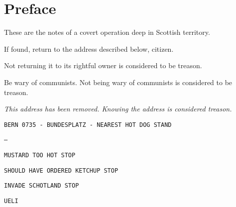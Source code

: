 \chapter{Preface}

These are the notes of a covert operation deep in Scottish territory.

\bigskip

If found, return to the address described below, citizen.

Not returning it to its rightful owner is considered to be treason.

Be wary of communists.
Not being wary of communists is considered to be treason.

\smallskip
\emph{This address has been removed. Knowing the address is considered treason.}
\smallskip

\newpage

\texttt{BERN 0735 - BUNDESPLATZ - NEAREST HOT DOG STAND}

\texttt{---}

\texttt{MUSTARD TOO HOT STOP}

\texttt{SHOULD HAVE ORDERED KETCHUP STOP}

\texttt{INVADE SCHOTLAND STOP}

\texttt{UELI}